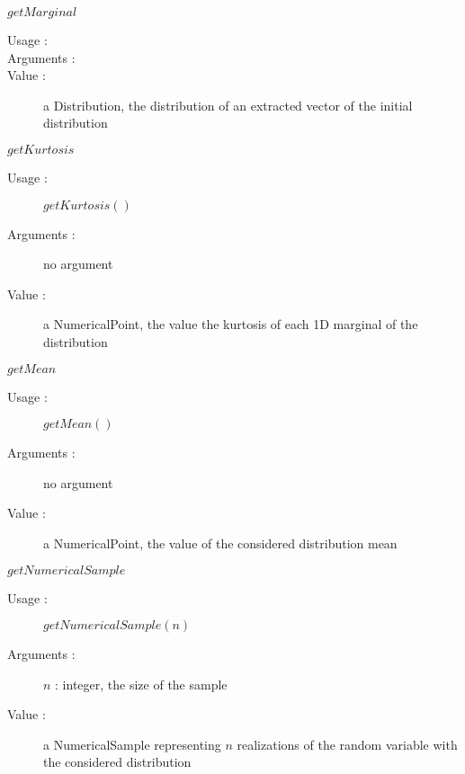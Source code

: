 \begin{description}
\begin{description}
  \item $getMarginal$
    \begin{description}
    \item[Usage :] \rule{0pt}{1em}


    \item[Arguments :]  \rule{0pt}{1em}

    \item[Value :] a Distribution, the distribution of an extracted vector of the initial distribution
    \end{description}
    \bigskip

  \item $getKurtosis$
    \begin{description}
    \item[Usage :] $getKurtosis()$
    \item[Arguments :] no argument
    \item[Value :] a NumericalPoint, the value the kurtosis of each 1D marginal of the distribution
    \end{description}
    \bigskip

  \item $getMean$
    \begin{description}
    \item[Usage :] $getMean()$
    \item[Arguments :] no argument
    \item[Value :] a NumericalPoint, the value of the considered distribution mean
    \end{description}
    \bigskip

  \item $getNumericalSample$
    \begin{description}
    \item[Usage :] $getNumericalSample(n)$
    \item[Arguments :] $n$ : integer, the size of the sample
    \item[Value :] a NumericalSample representing $n$ realizations of the random variable with the considered distribution
    \end{description}
    \bigskip


\end{description}
\end{description}
